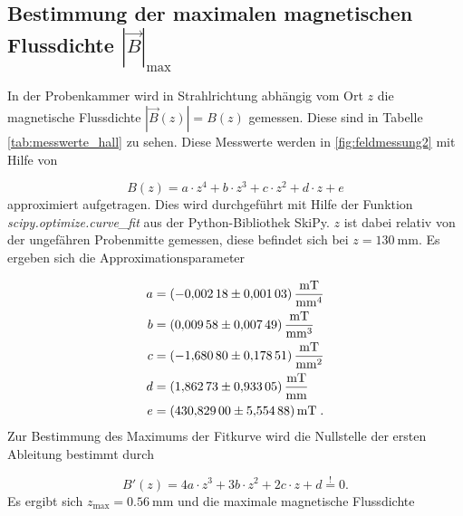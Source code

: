 \documentclass[
  bibliography=totoc,     %
  captions=tableheading,  %
  titlepage=firstiscover, %
]{scrartcl}
\begin{document}
\subsection{Bestimmung der maximalen magnetischen Flussdichte $|\vec{B}|_\text{max}$}

In der Probenkammer wird in Strahlrichtung abhängig vom Ort $z$ die magnetische Flussdichte $|\vec{B}(z)| = B(z)$
gemessen. Diese sind in Tabelle \ref{tab:messwerte_hall} zu sehen. Diese Messwerte werden in \ref{fig:feldmessung2} mit
Hilfe von

\begin{equation}
    B(z) = a \cdot z^4 + b \cdot z^3 + c \cdot z^2 + d \cdot z + e
\end{equation}
approximiert aufgetragen. Dies wird durchgeführt mit Hilfe der Funktion \textit{scipy.optimize.curve\_fit} aus der Python-Bibliothek SkiPy.
$z$ ist dabei relativ von der ungefähren Probenmitte gemessen, diese befindet sich bei $z = \SI{130}{\milli\metre}$.
Es ergeben sich die Approximationsparameter

\begin{align*}
    a &= \SI{-0.00218 +- 0.00103}{\milli\tesla\per\milli\meter\tothe{4}} \\
    b &= \SI{ 0.00958 +- 0.00749}{\milli\tesla\per\milli\meter\tothe{3}} \\
    c &= \SI{-1.68080 +- 0.17851}{\milli\tesla\per\milli\meter\tothe{2}} \\
    d &= \SI{ 1.86273 +- 0.93305}{\milli\tesla\per\milli\meter}          \\
    e &= \SI{ 430.829 +- 5.55488}{\milli\tesla} \; .
\end{align*}
Zur Bestimmung des Maximums der Fitkurve wird die Nullstelle der ersten Ableitung bestimmt durch

\begin{equation}
    B'(z) = 4a \cdot z^3 + 3b \cdot z^2 + 2c \cdot z + d \stackrel{!}{=} 0.
\end{equation}
Es ergibt sich $z_\text{max} = \SI{0.56}{\milli\meter}$ und die maximale magnetische Flussdichte
\end{document}
